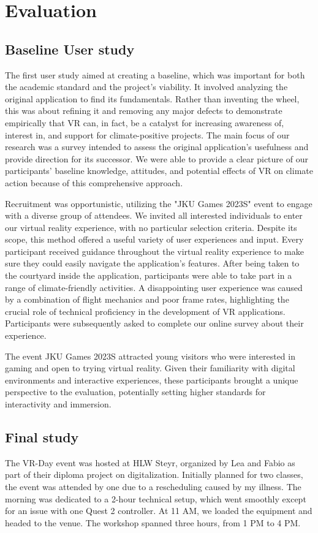\documentclass[draft, final]{vutinfth} %
\begin{document}
\chapter{Evaluation}
\section{Baseline User study}
The first user study aimed at creating a baseline, which was important for both the academic standard and the project's viability. It involved analyzing the original application to find its fundamentals. Rather than inventing the wheel, this was about refining it and removing any major defects to demonstrate empirically that VR can, in fact, be a catalyst for increasing awareness of, interest in, and support for climate-positive projects. The main focus of our research was a survey intended to assess the original application's usefulness and provide direction for its successor. We were able to provide a clear picture of our participants' baseline knowledge, attitudes, and potential effects of VR on climate action because of this comprehensive approach.

Recruitment was opportunistic, utilizing the "JKU Games 2023S" event to engage with a diverse group of attendees. We invited all interested individuals to enter our virtual reality experience, with no particular selection criteria. Despite its scope, this method offered a useful variety of user experiences and input. Every participant received guidance throughout the virtual reality experience to make sure they could easily navigate the application's features. After being taken to the courtyard inside the application, participants were able to take part in a range of climate-friendly activities. A disappointing user experience was caused by a combination of flight mechanics and poor frame rates, highlighting the crucial role of technical proficiency in the development of VR applications. Participants were subsequently asked to complete our online survey about their experience.

The event JKU Games 2023S attracted young visitors who were interested in gaming and open to trying virtual reality. Given their familiarity with digital environments and interactive experiences, these participants brought a unique perspective to the evaluation, potentially setting higher standards for interactivity and immersion.

    
\section{Final study}
The VR-Day event was hosted at HLW Steyr, organized by Lea and Fabio as part of their diploma project on digitalization. Initially planned for two classes, the event was attended by one due to a rescheduling caused by my illness. The morning was dedicated to a 2-hour technical setup, which went smoothly except for an issue with one Quest 2 controller. At 11 AM, we loaded the equipment and headed to the venue. The workshop spanned three hours, from 1 PM to 4 PM.
\end{document}
